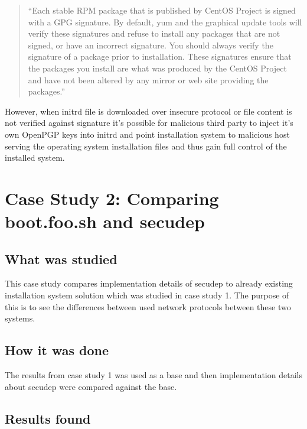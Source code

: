 \begin{quote}
``Each stable RPM package that is published by CentOS Project is signed
with a GPG signature. By default, yum and the graphical update tools
will verify these signatures and refuse to install any packages that
are not signed, or have an incorrect signature. You should always
verify the signature of a package prior to installation. These
signatures ensure that the packages you install are what was produced
by the CentOS Project and have not been altered by any mirror or
web site providing the packages.''
\end{quote}

However, when initrd file is downloaded over insecure protocol or file
content is not verified against signature it's possible for malicious
third party to inject it's own OpenPGP keys into initrd and point
installation system to malicious host serving the operating system
installation files and thus gain full control of the installed system.


\section{Case Study 2: Comparing boot.foo.sh and secudep}
\label{sec:casestudy2}

\subsection{What was studied}

This case study compares implementation details of secudep to already
existing installation system solution which was studied in
case study 1. The purpose of this is to see the differences between
used network protocols between these two systems.

\subsection{How it was done}

The results from case study 1 was used as a base and then
implementation details about secudep were compared against the base.

\subsection{Results found}

